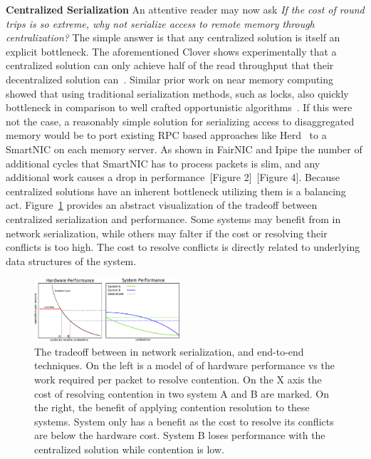 

\textbf{Centralized Serialization} 
An attentive reader may now ask \textit{If the cost of round trips is so
extreme, why not serialize access to remote memory through centralization?} The
simple answer is that any centralized solution is itself an explicit bottleneck.
The aforementioned Clover shows experimentally that a centralized solution can
only achieve half of the read throughput that their decentralized solution
can~\cite{clover}. Similar prior work on near memory computing showed that using
traditional serialization methods, such as locks, also quickly bottleneck in
comparison to well crafted opportunistic algorithms~\cite{near-memory-structs}.
If this were not the case, a reasonably simple solution for serializing access
to disaggregated memory would be to port existing RPC based approaches like
Herd~\cite{herd} to a SmartNIC on each memory server. As shown in FairNIC and
Ipipe the number of additional cycles that SmartNIC has to process packets is
slim, and any additional work causes a drop in performance~\cite{fairnic}[Figure
2]~\cite{ipipe}[Figure 4]. Because centralized solutions have an inherent
bottleneck utilizing them is a balancing act. Figure~\ref{fig:middlebox_model}
provides an abstract visualization of the tradeoff between centralized
serialization and performance. Some systems may benefit from in network
serialization, while others may falter if the cost or resolving their conflicts
is too high. The cost to resolve conflicts is directly related to underlying
data structures of the system.

\begin{figure}
    \includegraphics[width=0.48\textwidth]{fig/in_network_tradeoff.pdf}

    \caption{The tradeoff between in network serialization, and end-to-end
    techniques. On the left is a model of of hardware performance vs the work
    required per packet to resolve contention. On the X axis the cost of
    resolving contention in two system A and B are marked. On the right, the
    benefit of applying contention resolution to these systems. System only has
    a benefit as the cost to resolve its conflicts are below the hardware cost.
    System B loses performance with the centralized solution while contention is
    low.}

    \label{fig:middlebox_model}
\end{figure}

